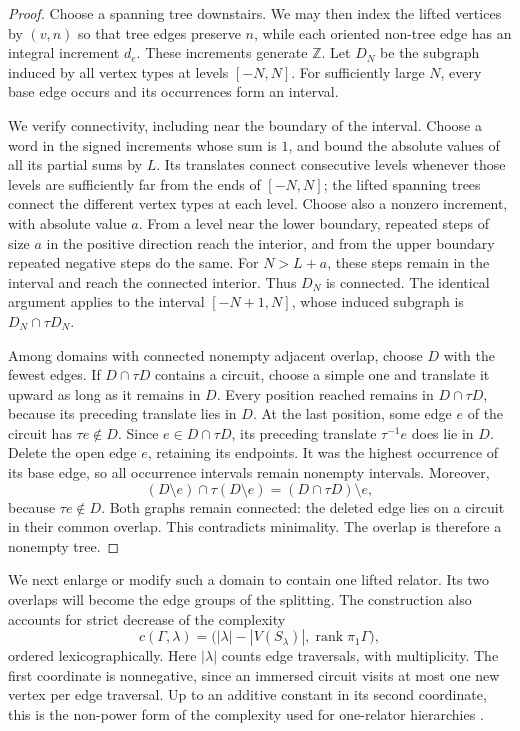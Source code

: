 \begin{proof}
Choose a spanning tree downstairs.  We may then index the lifted
vertices by $(v,n)$ so that tree edges preserve $n$, while each
oriented non-tree edge has an integral increment $d_e$.
These increments generate $\mathbb Z$.
Let $D_N$ be the subgraph induced by all vertex types at levels
$[-N,N]$.  For sufficiently large $N$, every base edge occurs and
its occurrences form an interval.

We verify connectivity, including near the boundary of the
interval.  Choose a word in the signed increments whose sum is
$1$, and bound the absolute values of all its partial sums by
$L$.  Its translates connect consecutive levels whenever those
levels are sufficiently far from the ends of $[-N,N]$; the lifted
spanning trees connect the different vertex types at each level.
Choose also a nonzero increment, with absolute value $a$.
From a level near the lower boundary, repeated steps of size
$a$ in the positive direction reach the interior, and from the
upper boundary repeated negative steps do the same.  For
$N>L+a$, these steps remain in the interval and reach the
connected interior.  Thus $D_N$ is connected.  The identical
argument applies to the interval $[-N+1,N]$, whose induced
subgraph is $D_N\cap\tau D_N$.

Among domains with connected nonempty adjacent overlap, choose
$D$ with the fewest edges.  If $D\cap\tau D$ contains a circuit,
choose a simple one and translate it upward as long as it remains
in $D$.  Every position reached remains in $D\cap\tau D$,
because its preceding translate lies in $D$.
At the last position, some edge $e$ of the circuit has
$\tau e\notin D$.  Since $e\in D\cap\tau D$, its preceding
translate $\tau^{-1}e$ does lie in $D$.
Delete the open edge $e$, retaining its endpoints.
It was the highest occurrence of its base edge, so all occurrence
intervals remain nonempty intervals.  Moreover,
\[
 (D\setminus e)\cap\tau(D\setminus e)
   =(D\cap\tau D)\setminus e,
\]
because $\tau e\notin D$.
Both graphs remain connected: the deleted edge lies on a circuit
in their common overlap.  This contradicts minimality.
The overlap is therefore a nonempty tree.
\end{proof}

We next enlarge or modify such a domain to contain one lifted
relator.  Its two overlaps will become the edge groups of the
splitting.  The construction also accounts for strict decrease
of the complexity
\begin{equation}\label{mag:complexity}
 c(\Gamma,\lambda)=
 \bigl(|\lambda|-|V(S_\lambda)|,
             \operatorname{rank}\pi_1\Gamma\bigr),
\end{equation}
ordered lexicographically.  Here $|\lambda|$ counts edge
traversals, with multiplicity.  The first coordinate is
nonnegative, since an immersed circuit visits at most one new
vertex per edge traversal.  Up to an additive constant in its
second coordinate, this is the non-power form of the complexity
used for one-relator hierarchies
\cite[Section~4.3]{LintonHierarchies2025}.

